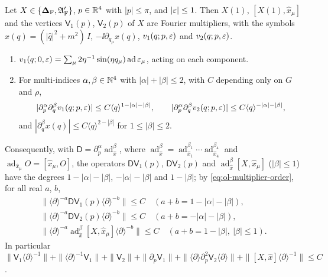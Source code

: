 \begin{lemma}\label{lem:ol-vertex-bounds}
Let $X\in\{\boldsymbol{\Delta}_{\rm F},\mathfrak A'_{\rm F}\}$, $p\in\mathbb R^4$ with $|p|\le\pi$, and $|\varepsilon|\le1$. Then $X(1)$, $[X(1),\hat x_\mu]$ and the vertices $\mathsf V_1(p)$, $\mathsf V_2(p)$ of $X$ are Fourier multipliers, with the symbols $x(q)=(|\hat q|^2+m^2)\,I$, $-\ii\partial_{q_\mu}x(q)$, $v_1(q;p,\varepsilon)$ and $v_2(q;p,\varepsilon)$.
\begin{enumerate}[label=(\alph*)]
\item $v_1(q;0,\varepsilon)=\sum_\mu2\eta^{-1}\sin(\eta q_\mu)\operatorname{ad}\varepsilon_\mu$, acting on each component.
\item For multi-indices $\alpha,\beta\in\mathbb N^4$ with $|\alpha|+|\beta|\le2$, with $C$ depending only on $G$ and $\rho$,
\[
|\partial_p^\alpha\partial_q^\beta v_1(q;p,\varepsilon)|\le C\langle q\rangle^{1-|\alpha|-|\beta|},\qquad|\partial_p^\alpha\partial_q^\beta v_2(q;p,\varepsilon)|\le C\langle q\rangle^{-|\alpha|-|\beta|},
\]
and $|\partial_q^\beta x(q)|\le C\langle q\rangle^{2-|\beta|}$ for $1\le|\beta|\le2$.
\end{enumerate}
Consequently, with $\mathsf D=\partial_p^\alpha\operatorname{ad}_{\hat x}^\beta$, where $\operatorname{ad}_{\hat x}^\beta=\operatorname{ad}_{\hat x_1}^{\beta_1}\cdots\operatorname{ad}_{\hat x_4}^{\beta_4}$ and $\operatorname{ad}_{\hat x_\mu}O=[\hat x_\mu,O]$, the operators $\mathsf D\mathsf V_1(p)$, $\mathsf D\mathsf V_2(p)$ and $\operatorname{ad}_{\hat x}^\beta[X,\hat x_\mu]$ ($|\beta|\le1$) have the degrees $1-|\alpha|-|\beta|$, $-|\alpha|-|\beta|$ and $1-|\beta|$; by \eqref{eq:ol-multiplier-order}, for all real $a$, $b$,
\begin{equation}\label{eq:ol-vertex-bounds}
\begin{gathered}
\|\langle\partial\rangle^{-a}\mathsf D\mathsf V_1(p)\langle\partial\rangle^{-b}\|\le C\quad(a+b=1-|\alpha|-|\beta|),\\
\|\langle\partial\rangle^{-a}\mathsf D\mathsf V_2(p)\langle\partial\rangle^{-b}\|\le C\quad(a+b=-|\alpha|-|\beta|),\\
\|\langle\partial\rangle^{-a}\operatorname{ad}_{\hat x}^\beta[X,\hat x_\mu]\langle\partial\rangle^{-b}\|\le C\quad(a+b=1-|\beta|,\ |\beta|\le1).
\end{gathered}
\end{equation}
In particular $\|\mathsf V_1\langle\partial\rangle^{-1}\|+\|\langle\partial\rangle^{-1}\mathsf V_1\|+\|\mathsf V_2\|+\|\partial_p\mathsf V_1\|+\|\langle\partial\rangle\partial_p^2\mathsf V_2\langle\partial\rangle\|+\|[X,\hat x]\langle\partial\rangle^{-1}\|\le C$.
\end{lemma}

